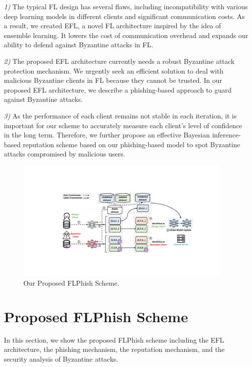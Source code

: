 \documentclass[journal]{IEEEtran}
\begin{document}
\par \textit{1)} The typical FL design has several flaws, including incompatibility with various deep learning models in different clients and significant communication costs. As a result, we created EFL, a novel FL architecture inspired by the idea of ensemble learning. It lowers the cost of communication overhead and expands our ability to defend against Byzantine attacks in FL.
\par \textit{2)} The proposed EFL architecture currently needs a robust Byzantine attack protection mechanism. We urgently seek an efficient solution to deal with malicious Byzantine clients in FL because they cannot be trusted. In our proposed EFL architecture, we describe a phishing-based approach to guard against Byzantine attacks.
\par \textit{3)} As the performance of each client remains not stable in each iteration, it is important for our scheme to accurately measure each client's level of confidence in the long term. Therefore, we further propose an effective Bayesian inference-based reputation scheme based on our phishing-based model to spot Byzantine attacks compromised by malicious users.

\begin{figure}
  \centering
\includegraphics[width=0.95\textwidth]{figures/Figure_FLPhish.pdf}
\caption{Our Proposed FLPhish Scheme.}
\label{fig_Phishing}
\end{figure}   


\section{Proposed FLPhish Scheme}
In this section, we show the proposed FLPhish scheme including the EFL architecture, the phishing mechanism, the reputation mechanism, and the security analysis of Byzantine attacks.
\end{document}
